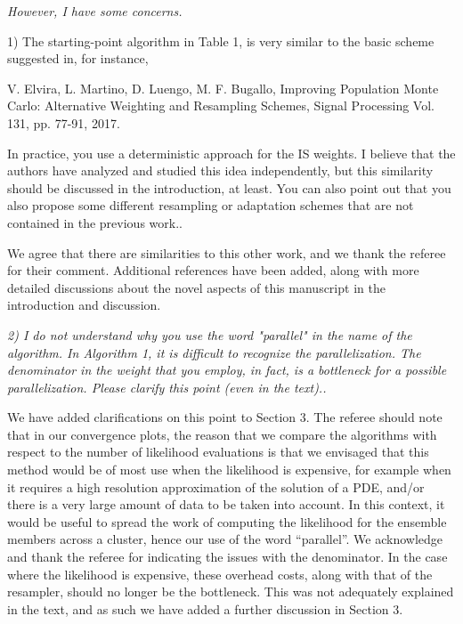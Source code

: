 \documentclass{article}
\newcommand{\comment}[2]{\vspace{0.6cm}{\bf Comment:} {\it #1.}

\vspace{0.3cm}{\bf Answer:} #2}
\begin{document}
\comment{However, I have some concerns. 

1) The starting-point algorithm in Table 1, is very similar to the basic scheme suggested in, for instance, 

V. Elvira, L. Martino, D. Luengo, M. F. Bugallo, Improving Population Monte Carlo: Alternative Weighting and Resampling Schemes, Signal Processing Vol. 131, pp. 77-91, 2017. 

In practice, you use a deterministic approach for the IS weights. 
I believe that the authors have analyzed and studied this idea independently, but this similarity should be discussed in the introduction, at least. 
You can also point out that you also propose some different resampling or adaptation schemes that are not contained in the previous work.}{We agree that there are similarities to this other work, and we thank the referee for their comment. Additional references have been added, along with more detailed discussions about the novel aspects of this manuscript in the introduction and discussion.}

\comment{2) I do not understand why you use the word "parallel" in the name of the algorithm. In Algorithm 1, it is difficult to recognize the parallelization. The denominator in the weight that you employ, in fact, is a bottleneck for a possible parallelization. Please clarify this point (even in the text).}{We have added clarifications on this point to Section 3. The referee should note that in our convergence plots, the reason that we compare the algorithms with respect to the number of likelihood evaluations is that we envisaged that this method would be of most use when the likelihood is expensive, for example when it requires a high resolution approximation of the solution of a PDE, and/or there is a very large amount of data to be taken into account. In this context, it would be useful to spread the work of computing the likelihood for the ensemble members across a cluster, hence our use of the word ``parallel''. We acknowledge and thank the referee for indicating the issues with the denominator. In the case where the likelihood is expensive, these overhead costs, along with that of the resampler, should no longer be the bottleneck. This was not adequately explained in the text, and as such we have added a further discussion in Section 3.

}
\end{document}
